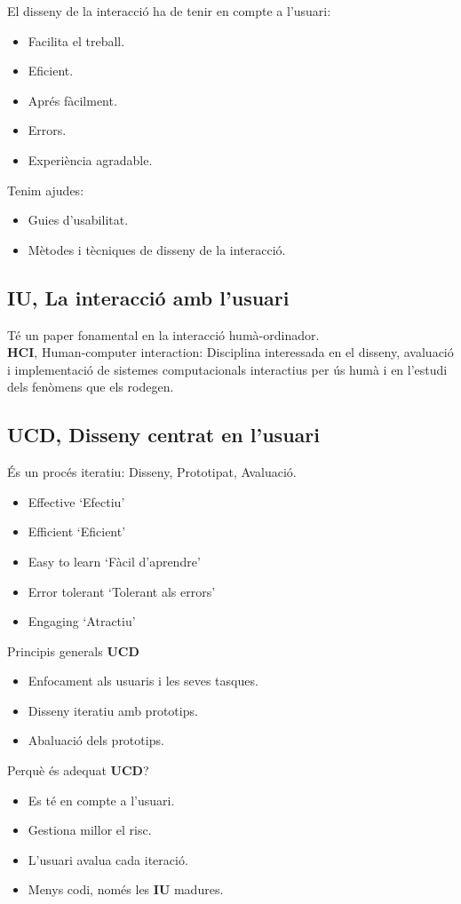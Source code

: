 El disseny de la interacció ha de tenir en compte a l'usuari:
\begin{itemize} %
    \item Facilita el treball.
    \item Eficient.
    \item Aprés fàcilment.
    \item Errors.
    \item Experiència agradable.
\end{itemize}
Tenim ajudes:
\begin{itemize}
    \item Guies d'usabilitat. %
    \item Mètodes i tècniques de disseny de la interacció.
\end{itemize}

\subsection{\textbf{IU}, La interacció amb l'usuari}
Té un paper fonamental en la interacció humà-ordinador.\\
\textbf{HCI}, Human-computer interaction:
Disciplina interessada en el disseny,
avaluació i implementació de sistemes computacionals interactius per ús humà i en l'estudi dels fenòmens que els rodegen.

\subsection{\textbf{UCD}, Disseny centrat en l'usuari}
És un procés iteratiu: Disseny, Prototipat, Avaluació. %
\begin{itemize}
    \item Effective `Efectiu'
    \item Efficient `Eficient'
    \item Easy to learn `Fàcil d'aprendre'
    \item Error tolerant `Tolerant als errors'
    \item Engaging `Atractiu'
\end{itemize}
%
Principis generals \textbf{UCD}
\begin{itemize}
    \item Enfocament als usuaris i les seves tasques.
    \item Disseny iteratiu amb prototips.
    \item Abaluació dels prototips.
\end{itemize}
%
Perquè és adequat \textbf{UCD}?
\begin{itemize}
    \item Es té en compte a l'usuari.
    \item Gestiona millor el risc.
    \item L'usuari avalua cada iteració.
    \item Menys codi, només les \textbf{IU} madures.
\end{itemize}

